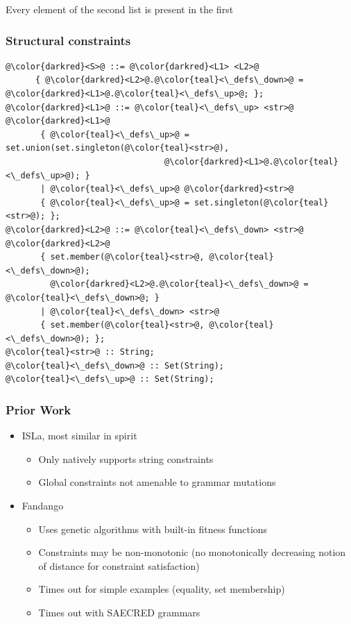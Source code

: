 \documentclass[11pt,xcolor={dvipsnames},hyperref={pdftex,pdfpagemode=UseNone,hidelinks,pdfdisplaydoctitle=true},usepdftitle=false]{beamer}
\newcommand{\green}[1]{\textcolor{green!60!black}{#1}}
\begin{document}

\begin{frame}[fragile]
Every element of the second list is present in the first
    \frametitle{Structural constraints}
\begin{lstlisting}[style=goblin]
@\color{darkred}<S>@ ::= @\color{darkred}<L1> <L2>@
      { @\color{darkred}<L2>@.@\color{teal}<\_defs\_down>@ = @\color{darkred}<L1>@.@\color{teal}<\_defs\_up>@; };
@\color{darkred}<L1>@ ::= @\color{teal}<\_defs\_up> <str>@ @\color{darkred}<L1>@
       { @\color{teal}<\_defs\_up>@ = set.union(set.singleton(@\color{teal}<str>@), 
                                @\color{darkred}<L1>@.@\color{teal}<\_defs\_up>@); }
       | @\color{teal}<\_defs\_up>@ @\color{darkred}<str>@
       { @\color{teal}<\_defs\_up>@ = set.singleton(@\color{teal}<str>@); };
@\color{darkred}<L2>@ ::= @\color{teal}<\_defs\_down> <str>@ @\color{darkred}<L2>@ 
       { set.member(@\color{teal}<str>@, @\color{teal}<\_defs\_down>@); 
         @\color{darkred}<L2>@.@\color{teal}<\_defs\_down>@ = @\color{teal}<\_defs\_down>@; }
       | @\color{teal}<\_defs\_down> <str>@
       { set.member(@\color{teal}<str>@, @\color{teal}<\_defs\_down>@); };
@\color{teal}<str>@ :: String;
@\color{teal}<\_defs\_down>@ :: Set(String); 
@\color{teal}<\_defs\_up>@ :: Set(String);
\end{lstlisting}
\end{frame}

\begin{frame} 
    \frametitle{Prior Work} 
    \begin{itemize}
        \item ISLa, most similar in spirit 
        \begin{itemize}
            \item Only natively supports string constraints
            \item Global constraints not amenable to \green{grammar mutations}
        \end{itemize}
        \item Fandango
    \begin{itemize}
        \item Uses  \green{genetic algorithms} with built-in fitness functions
        \item Constraints may be \green{non-monotonic} (no monotonically decreasing notion of distance for constraint satisfaction)
        \item Times out for simple examples (equality, set membership)
        \item Times out with SAECRED grammars
    \end{itemize}
    \end{itemize}
\end{frame}
\end{document}
